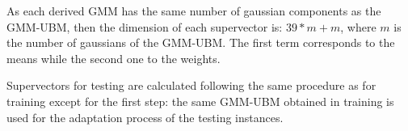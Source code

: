 As each derived GMM has the same number of gaussian components as the GMM-UBM, then the dimension
of each supervector is: $39*m + m$, where $m$ is the number of gaussians of the GMM-UBM. The
first term corresponds to the means while the second one to the weights.


Supervectors for testing are calculated following the same procedure as for training except for
the first step: the same GMM-UBM obtained in training is used for the adaptation process of the
testing instances.
